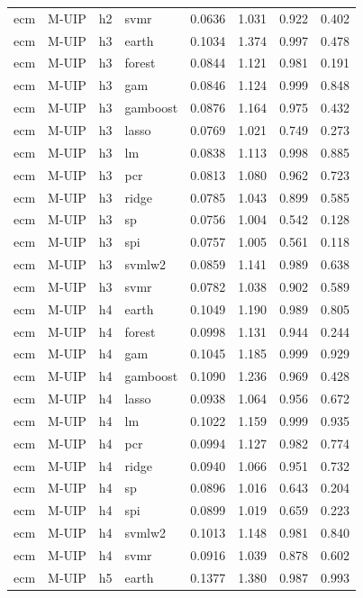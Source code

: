 \begin{ThreePartTable}
\begin{longtable}[t]{llclcccc}
ecm & M-UIP & h2 & svmr & 0.0636 & 1.031 & 0.922 & 0.402\\
\addlinespace
ecm & M-UIP & h3 & earth & 0.1034 & 1.374 & 0.997 & 0.478\\
ecm & M-UIP & h3 & forest & 0.0844 & 1.121 & 0.981 & 0.191\\
ecm & M-UIP & h3 & gam & 0.0846 & 1.124 & 0.999 & 0.848\\
ecm & M-UIP & h3 & gamboost & 0.0876 & 1.164 & 0.975 & 0.432\\
ecm & M-UIP & h3 & lasso & 0.0769 & 1.021 & 0.749 & 0.273\\
ecm & M-UIP & h3 & lm & 0.0838 & 1.113 & 0.998 & 0.885\\
ecm & M-UIP & h3 & pcr & 0.0813 & 1.080 & 0.962 & 0.723\\
ecm & M-UIP & h3 & ridge & 0.0785 & 1.043 & 0.899 & 0.585\\
ecm & M-UIP & h3 & sp & 0.0756 & 1.004 & 0.542 & 0.128\\
ecm & M-UIP & h3 & spi & 0.0757 & 1.005 & 0.561 & 0.118\\
ecm & M-UIP & h3 & svmlw2 & 0.0859 & 1.141 & 0.989 & 0.638\\
ecm & M-UIP & h3 & svmr & 0.0782 & 1.038 & 0.902 & 0.589\\
\addlinespace
ecm & M-UIP & h4 & earth & 0.1049 & 1.190 & 0.989 & 0.805\\
ecm & M-UIP & h4 & forest & 0.0998 & 1.131 & 0.944 & 0.244\\
ecm & M-UIP & h4 & gam & 0.1045 & 1.185 & 0.999 & 0.929\\
ecm & M-UIP & h4 & gamboost & 0.1090 & 1.236 & 0.969 & 0.428\\
ecm & M-UIP & h4 & lasso & 0.0938 & 1.064 & 0.956 & 0.672\\
ecm & M-UIP & h4 & lm & 0.1022 & 1.159 & 0.999 & 0.935\\
ecm & M-UIP & h4 & pcr & 0.0994 & 1.127 & 0.982 & 0.774\\
ecm & M-UIP & h4 & ridge & 0.0940 & 1.066 & 0.951 & 0.732\\
ecm & M-UIP & h4 & sp & 0.0896 & 1.016 & 0.643 & 0.204\\
ecm & M-UIP & h4 & spi & 0.0899 & 1.019 & 0.659 & 0.223\\
ecm & M-UIP & h4 & svmlw2 & 0.1013 & 1.148 & 0.981 & 0.840\\
ecm & M-UIP & h4 & svmr & 0.0916 & 1.039 & 0.878 & 0.602\\
\addlinespace
ecm & M-UIP & h5 & earth & 0.1377 & 1.380 & 0.987 & 0.993\\

\end{longtable}
\end{ThreePartTable}
